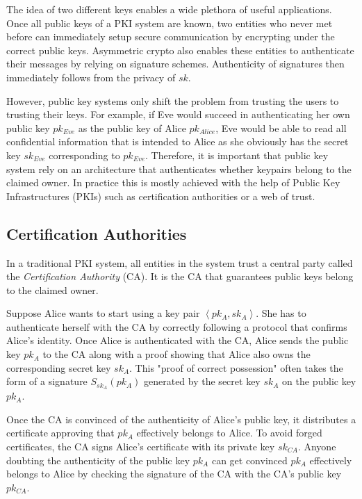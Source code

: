 The idea of two different keys enables a wide plethora of useful applications. Once all public keys of a PKI system are known, two entities who never met before can immediately setup secure communication by encrypting under the correct public keys. Asymmetric crypto also enables these entities to authenticate their messages by relying on signature schemes. Authenticity of signatures then immediately follows from the privacy of $sk$.

However, public key systems only shift the problem from trusting the users to trusting their keys. For example, if Eve would succeed in authenticating her own public key $pk_{Eve}$ as the public key of Alice $pk_{Alice}$, Eve would be able to read all confidential information that is intended to Alice as she obviously has the secret key $sk_{Eve}$ corresponding to $pk_{Eve}$. Therefore, it is important that public key system rely on an architecture that authenticates whether keypairs belong to the claimed owner. In practice this is mostly achieved with the help of Public Key Infrastructures (PKIs) such as certification authorities or a web of trust.

\subsection{Certification Authorities}
In a traditional PKI system, all entities in the system trust a central party called the \textit{Certification Authority} (CA). It is the CA that guarantees public keys belong to the claimed owner.

Suppose Alice wants to start using a key pair $\left< pk_A, sk_A \right>$. She has to authenticate herself with the CA by correctly following a protocol that confirms Alice's identity. Once Alice is authenticated with the CA, Alice sends the public key $pk_A$ to the CA along with a proof showing that Alice also owns the corresponding secret key $sk_A$. This "proof of correct possession" often takes the form of a signature $S_{sk_A} \left( pk_A \right)$ generated by the secret key $sk_A$ on the public key $pk_A$.

Once the CA is convinced of the authenticity of Alice's public key, it distributes a certificate approving that $pk_A$ effectively belongs to Alice. To avoid forged certificates, the CA signs Alice's certificate with its private key $sk_{CA}$. Anyone doubting the authenticity of the public key $pk_A$ can get convinced $pk_A$ effectively belongs to Alice by checking the signature of the CA with the CA's public key $pk_{CA}$.


